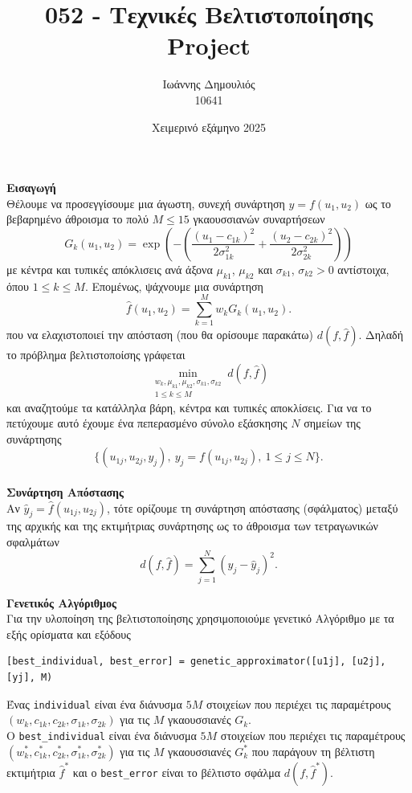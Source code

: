 \documentclass[12pt]{article}
\title{\vspace{-2cm}052 - Τεχνικές Βελτιστοποίησης\\
    \large Project}
\author{Ιωάννης Δημουλιός \\ 10641}
\date{Χειμερινό εξάμηνο 2025}
\begin{document}
\maketitle
\textbf{Εισαγωγή} \\
Θέλουμε να προσεγγίσουμε μια άγωστη, συνεχή συνάρτηση \(y = f(u_1, u_2)\) ως το βεβαρημένο άθροισμα το πολύ $ M \leq 15$ γκαουσσιανών συναρτήσεων 
\[G_k(u_1, u_2) = \exp\left(-\left( \dfrac{(u_1 - c_{1k})^2}{2\sigma_{1k}^2} + \dfrac{(u_2 - c_{2k})^2}{2\sigma_{2k}^2}\right) \right)\] 
με κέντρα και τυπικές απόκλισεις ανά άξονα $\mu_{k1}$, $\mu_{k2}$ και $\sigma_{k1}$, $\sigma_{k2} > 0$ αντίστοιχα, όπου $1 \leq k \leq M$. Επομένως, ψάχνουμε μια συνάρτηση 
\[
\hat{f}(u_1, u_2) = \sum_{k=1}^{M} w_k G_k(u_1, u_2)
.\] 
που να ελαχιστοποιεί την απόσταση (που θα ορίσουμε παρακάτω) $d(f, \hat{f})$. Δηλαδή το πρόβλημα βελτιστοποίσης γράφεται 
\[
\min_{\substack{w_k, \mu_{k1}, \mu_{k2} ,\sigma_{k1}, \sigma_{k2}\\ 1 \leq k \leq M}} d(f, \hat{f})
\]
και αναζητούμε τα κατάλληλα βάρη, κέντρα και τυπικές αποκλίσεις. 
Για να το πετύχουμε αυτό έχουμε ένα πεπερασμένο σύνολο εξάσκησης $N$ σημείων της συνάρτησης 
\[
\{(u_{1j}, u_{2j}, y_j),\: y_j = f(u_{1j}, u_{2j}), \: 1 \leq j \leq N\}.
\] \\

\textbf{Συνάρτηση Απόστασης} \\
Αν \(\hat{y}_j = \hat{f}(u_{1j}, u_{2j})\), τότε ορίζουμε τη συνάρτηση απόστασης (σφάλματος) μεταξύ της αρχικής και της εκτιμήτριας συνάρτησης ως το άθροισμα των τετραγωνικών σφαλμάτων
\[
d(f, \hat{f}) = \sum_{j=1}^{N} (y_j - \hat{y}_j)^2
.\]

\textbf{Γενετικός Αλγόριθμος} \\
Για την υλοποίηση της βελτιστοποίησης χρησιμοποιούμε γενετικό Αλγόριθμο με τα εξής ορίσματα και εξόδους
\begin{verbatim}
[best_individual, best_error] = genetic_approximator([u1j], [u2j], [yj], M)
\end{verbatim}
Ένας \texttt{individual} είναι ένα διάνυσμα $5M$ στοιχείων που περιέχει τις παραμέτρους $(w_k, c_{1k}, c_{2k}, \sigma_{1k}, \sigma_{2k})$ για τις $M$ γκαουσσιανές $G_k$.\\
Ο \verb|best_individual| είναι ένα διάνυσμα $5M$ στοιχείων που περιέχει τις παραμέτρους $(w_k^*, c_{1k}^*, c_{2k}^*, \sigma_{1k}^*, \sigma_{2k}^*)$ για τις $M$ γκαουσσιανές $G_k^*$ που παράγουν τη βέλτιστη εκτιμήτρια $\hat{f}^*$ και ο \verb|best_error| είναι το βέλτιστο σφάλμα $d(f, \hat{f}^*)$. \\
\end{document}
